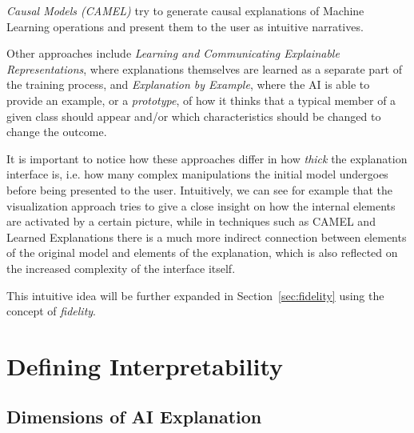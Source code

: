 \documentclass[conference]{IEEEtran}
\begin{document}
\textit{Causal Models (CAMEL)} try to generate causal explanations of Machine
Learning operations and present them to the user as intuitive narratives.


Other approaches include \textit{Learning and Communicating Explainable
    Representations}, where explanations themselves are learned as a separate
part of the training process, and \textit{Explanation by Example}, where the
AI is able to provide an example, or a \textit{prototype}, of how it thinks
that a typical member of a given class should appear and/or which
characteristics should be changed to change the outcome.


It is important to notice how these approaches differ in how \textit{thick} the explanation interface is, i.e. how many complex manipulations the initial model undergoes before being presented to the user. Intuitively, we can see for example that the visualization approach tries to give a close insight on how the internal elements are activated by a certain picture,
while in techniques such as CAMEL and Learned Explanations there is a much more
indirect connection between elements of the original model and elements of the
explanation, which is also reflected on the increased complexity of the
interface itself.

This intuitive idea will be further expanded in
Section~\ref{sec:fidelity} using the concept of \textit{fidelity}.

\section{Defining Interpretability}
\label{sec:explainability}

\subsection{Dimensions of AI Explanation}
\label{sec:dim}
\end{document}
